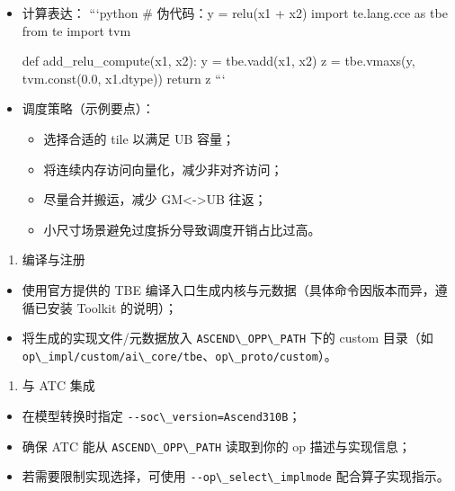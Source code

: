 \begin{itemize}
\item
  计算表达： ```python \# 伪代码：y = relu(x1 + x2) import te.lang.cce
  as tbe from te import tvm

  def add\_relu\_compute(x1, x2): y = tbe.vadd(x1, x2) z = tbe.vmaxs(y,
  tvm.const(0.0, x1.dtype)) return z ```
\item
  调度策略（示例要点）：

  \begin{itemize}
  \tightlist
  \item
    选择合适的 tile 以满足 UB 容量；
  \item
    将连续内存访问向量化，减少非对齐访问；
  \item
    尽量合并搬运，减少 GM\textless-\textgreater UB 往返；
  \item
    小尺寸场景避免过度拆分导致调度开销占比过高。
  \end{itemize}
\end{itemize}

\begin{enumerate}
\def\labelenumi{\arabic{enumi})}
\setcounter{enumi}{3}
\tightlist
\item
  编译与注册
\end{enumerate}

\begin{itemize}
\tightlist
\item
  使用官方提供的 TBE
  编译入口生成内核与元数据（具体命令因版本而异，遵循已安装 Toolkit
  的说明）；
\item
  将生成的实现文件/元数据放入
  \passthrough{\lstinline!ASCEND\_OPP\_PATH!} 下的 custom 目录（如
  \passthrough{\lstinline!op\_impl/custom/ai\_core/tbe!}、\passthrough{\lstinline!op\_proto/custom!}）。
\end{itemize}

\begin{enumerate}
\def\labelenumi{\arabic{enumi})}
\setcounter{enumi}{4}
\tightlist
\item
  与 ATC 集成
\end{enumerate}

\begin{itemize}
\tightlist
\item
  在模型转换时指定 \passthrough{\lstinline!--soc\_version=Ascend310B!}；
\item
  确保 ATC 能从 \passthrough{\lstinline!ASCEND\_OPP\_PATH!} 读取到你的
  op 描述与实现信息；
\item
  若需要限制实现选择，可使用
  \passthrough{\lstinline!--op\_select\_implmode!} 配合算子实现指示。
\end{itemize}

